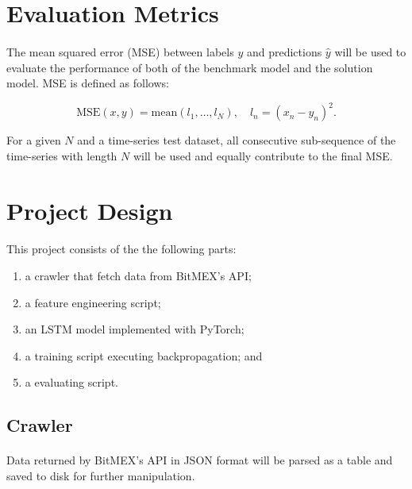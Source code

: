 \documentclass[12pt, letterpaper]{article}
\begin{document}
\section{Evaluation Metrics}

\paragraph{}
The mean squared error (MSE) between labels \(y\) and predictions \(\hat y\) will be used to evaluate the performance of both of the benchmark model and the solution model. MSE is defined as follows:

\begin{equation*}
    \mathrm{MSE}(x,y)=\mathrm{mean}\left(l_1,\dots,l_N\right), \quad l_n=\left(x_n-y_n\right)^2.
\end{equation*}

For a given \(N\) and a time-series test dataset, all consecutive sub-sequence of the time-series with length \(N\) will be used and equally contribute to the final MSE\@.

\section{Project Design}

\paragraph{}
This project consists of the the following parts:

\begin{enumerate}
    \item a crawler that fetch data from BitMEX's API\@;
    \item a feature engineering script;
    \item an LSTM model implemented with PyTorch;
    \item a training script executing backpropagation; and
    \item a evaluating script.
\end{enumerate}

\subsection{Crawler}

\paragraph{}
Data returned by BitMEX's API in JSON format will be parsed as a table and saved to disk for further manipulation.
\end{document}
